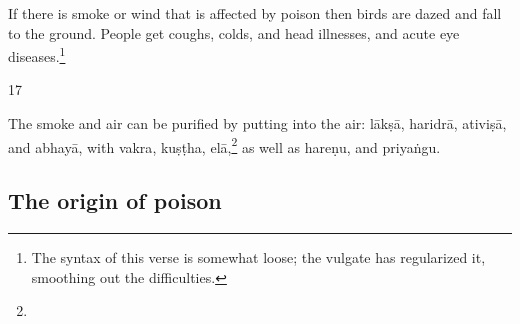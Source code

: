 \begin{translation}
If there is smoke or wind that  is affected by poison then  birds are
dazed and fall to the ground.  People get  coughs, colds, and head 
illnesses, and acute eye diseases.\footnote{The syntax  of this verse
    is somewhat  loose; the vulgate has regularized it, smoothing  out
    the difficulties.}

\item
[17]  

The smoke and air can be  purified by putting into the  air:  \gls{lākṣā}, 
\gls{haridrā}, \gls{ativiṣā}, and \gls{abhayā}, with \gls{vakra}, \gls{kuṣṭha}, 
\gls{elā},\footnote{} as well as \gls{hareṇu}, and \gls{priyaṅgu}.  
\end{translation}  


\subsection{The origin of  poison}  

